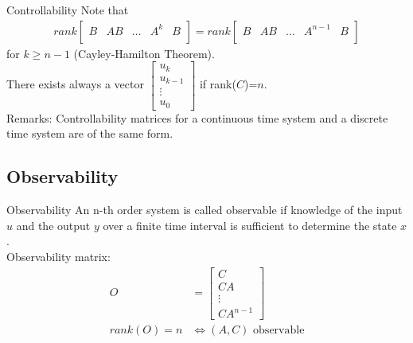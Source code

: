 \begin{frame}{Controllability}
Note that
\begin{align*}
rank    \begin{bmatrix}
             B&AB&\hdots&A^{k}&B\\
        \end{bmatrix} 
= rank \begin{bmatrix}
             B&AB&\hdots&A^{n-1}&B\\
        \end{bmatrix}
\end{align*}
for $k\geq n-1$ (Cayley-Hamilton Theorem).\\
There exists always a vector 
$\begin{bmatrix}
             u_k\\
             u_{k-1}\\
             \vdots\\
             u_0
        \end{bmatrix}$ 
if rank($C$)=$n$.
\\Remarks: Controllability matrices for a continuous time
system and a discrete time system are of the same form.
\end{frame}

\subsection{Observability}
\begin{frame}{Observability}
An n-th order system is called observable if knowledge of
the input $u$ and the output $y$ over a finite time interval is
sufficient to determine the state $x$.\\
\vspace{0,3cm}
Observability matrix: 
\begin{align*}
O&=      \begin{bmatrix}
             C\\
             CA\\
             \vdots\\
             CA^{n-1}
        \end{bmatrix}\\
rank(O)=n&\iff(A,C)\text{ observable}
\end{align*}
\end{frame}


